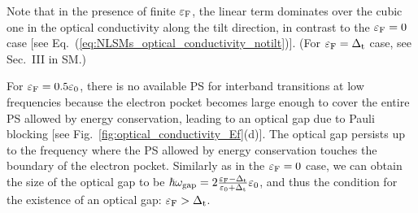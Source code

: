 \documentclass[aps,twocolumn,floatfix]{revtex4-1}
\begin{document}
Note that in the presence of finite $\varepsilon_{\rm F}$, the linear term dominates over the cubic one in the optical conductivity along the tilt direction, in contrast to the $\varepsilon_{\rm F}=0$ case [see Eq.~(\ref{eq:NLSMs_optical_conductivity_notilt})]. 
(For $\varepsilon_{\rm F}=\Delta_{\rm t}$ case, see Sec.~III in SM.)

For $\varepsilon_{\rm F}=0.5\varepsilon_0$, there is no available PS for interband transitions at low frequencies because the electron pocket becomes large enough to cover the entire PS allowed by energy conservation, leading to an optical gap due to Pauli blocking [see Fig.~\ref{fig:optical_conductivity_Ef}(d)]. The optical gap persists up to the frequency where the PS allowed by energy conservation touches the boundary of the electron pocket.
Similarly as in the $\varepsilon_{\rm F}=0$ case, we can obtain the size of the optical gap to be $\hbar\omega_{\rm gap}=2\frac{\varepsilon_{\rm F}-\Delta_{\rm t}}{\varepsilon_0+\Delta_{\rm t}} \varepsilon_0$, and thus the condition for the existence of an optical gap: $\varepsilon_{\rm F}>\Delta_{\rm t}$.
\end{document}
